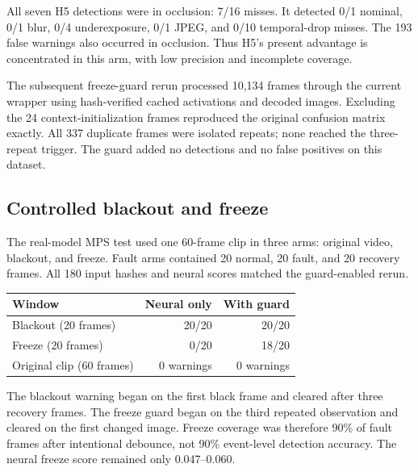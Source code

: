 \documentclass[sigconf,nonacm]{acmart}
\begin{document}
All seven H5 detections were in occlusion: 7/16 misses. It detected 0/1 nominal, 0/1 blur, 0/4 underexposure, 0/1 JPEG, and 0/10 temporal-drop misses. The 193 false warnings also occurred in occlusion. Thus H5's present advantage is concentrated in this arm, with low precision and incomplete coverage.

The subsequent freeze-guard rerun processed 10,134 frames through the current wrapper using hash-verified cached activations and decoded images. Excluding the 24 context-initialization frames reproduced the original confusion matrix exactly. All 337 duplicate frames were isolated repeats; none reached the three-repeat trigger. The guard added no detections and no false positives on this dataset.





\subsection{Controlled blackout and freeze}
The real-model MPS test used one 60-frame clip in three arms: original video, blackout, and freeze. Fault arms contained 20 normal, 20 fault, and 20 recovery frames. All 180 input hashes and neural scores matched the guard-enabled rerun.

\begin{center}
\begin{minipage}{\columnwidth}
\centering
{}
\small
\begin{tabular}{@{}lrr@{}}
\toprule
Window & Neural only & With guard\\
\midrule
Blackout (20 frames) & 20/20 & 20/20\\
Freeze (20 frames) & 0/20 & 18/20\\
Original clip (60 frames) & 0 warnings & 0 warnings\\
\bottomrule
\end{tabular}
\end{minipage}
\end{center}

The blackout warning began on the first black frame and cleared after three recovery frames. The freeze guard began on the third repeated observation and cleared on the first changed image. Freeze coverage was therefore 90\% of fault frames after intentional debounce, not 90\% event-level detection accuracy. The neural freeze score remained only 0.047--0.060.
\end{document}
